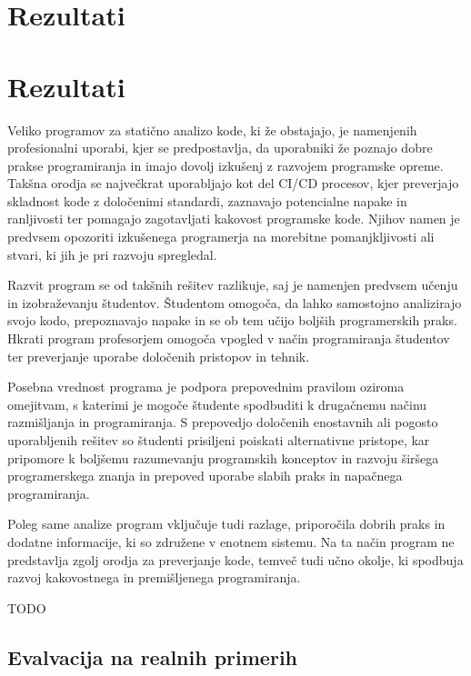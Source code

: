 \documentclass[a4paper,12pt,openright]{book}
\begin{document}
\chapter{Rezultati}  %
\label{slo}

\chapter{Rezultati}
\label{slo}

Veliko programov za statično analizo kode, ki že obstajajo, je namenjenih profesionalni uporabi, kjer se predpostavlja, da uporabniki že poznajo dobre prakse programiranja in imajo dovolj izkušenj z razvojem programske opreme. Takšna orodja se največkrat uporabljajo kot del CI/CD procesov, kjer preverjajo skladnost kode z določenimi standardi, zaznavajo potencialne napake in ranljivosti ter pomagajo zagotavljati kakovost programske kode. Njihov namen je predvsem opozoriti izkušenega programerja na morebitne pomanjkljivosti ali stvari, ki jih je pri razvoju spregledal.

Razvit program se od takšnih rešitev razlikuje, saj je namenjen predvsem učenju in izobraževanju študentov. Študentom omogoča, da lahko samostojno analizirajo svojo kodo, prepoznavajo napake in se ob tem učijo boljših programerskih praks. Hkrati program profesorjem omogoča vpogled v način programiranja študentov ter preverjanje uporabe določenih pristopov in tehnik.

Posebna vrednost programa je podpora prepovednim pravilom oziroma omejitvam, s katerimi je mogoče študente spodbuditi k drugačnemu načinu razmišljanja in programiranja. S prepovedjo določenih enostavnih ali pogosto uporabljenih rešitev so študenti prisiljeni poiskati alternativne pristope, kar pripomore k boljšemu razumevanju programskih konceptov in razvoju širšega programerskega znanja in prepoved uporabe slabih praks in napačnega programiranja.

Poleg same analize program vključuje tudi razlage, priporočila dobrih praks in dodatne informacije, ki so združene v enotnem sistemu. Na ta način program ne predstavlja zgolj orodja za preverjanje kode, temveč tudi učno okolje, ki spodbuja razvoj kakovostnega in premišljenega programiranja.

TODO

\section{Evalvacija na realnih primerih}
\end{document}
